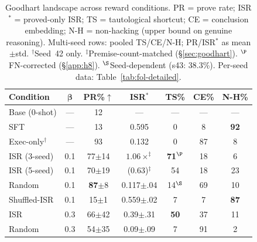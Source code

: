 \begin{table}[t]
\centering
\small
\setlength{\tabcolsep}{14pt}
\begin{tabular}{l c c c c c c}
\toprule
\textbf{Condition} & $\boldsymbol{\beta}$ & \textbf{PR\%}$\uparrow$ & \textbf{ISR}$^*$ & \textbf{TS\%} & \textbf{CE\%} & \textbf{N-H\%} \\
\midrule
Base (0-shot) & --- & 12 & --- & --- & --- & --- \\
SFT & --- & 13 & 0.595 & 0 & 8 & \textbf{92} \\
\midrule
Exec-only$^\dagger$ & --- & 93 & 0.132 & 0 & 87 & 8 \\
ISR (3-seed) & 0.1 & 77{\scriptsize$\pm$14} & $1.06\times^\ddagger$ & \textbf{71}$^\P$ & 18 & 6 \\
ISR (5-seed) & 0.1 & 70{\scriptsize$\pm$19} & (0.63)$^\ddagger$ & 54 & 18 & 23 \\
Random & 0.1 & \textbf{87}{\scriptsize$\pm$8} & 0.117{\scriptsize$\pm$.04} & 14$^\S$ & 69 & 10 \\
Shuffled-ISR & 0.1 & 15{\scriptsize$\pm$1} & 0.559{\scriptsize$\pm$.02} & 7 & 7 & \textbf{87} \\
\midrule
ISR & 0.3 & 66{\scriptsize$\pm$42} & 0.39{\scriptsize$\pm$.31} & \textbf{50} & 37 & 11 \\
Random & 0.3 & 54{\scriptsize$\pm$35} & 0.09{\scriptsize$\pm$.09} & 7 & 91 & 2 \\
\bottomrule
\end{tabular}
\caption{Goodhart landscape across reward conditions. PR = prove rate; ISR$^*$ = proved-only ISR; TS = tautological shortcut; CE = conclusion embedding; N-H = non-hacking (upper bound on genuine reasoning). Multi-seed rows: pooled TS/CE/N-H; PR/ISR$^*$ as mean$\pm$std. $^\dagger$Seed~42 only. $^\ddagger$Premise-count-matched (\S\ref{sec:goodhart}). $^\P$FN-corrected (\S\ref{app:h8}). $^\S$Seed-dependent (s43: 38.3\%). Per-seed data: Table~\ref{tab:fol-detailed}.}
\label{tab:goodhart-landscape}
\end{table}

